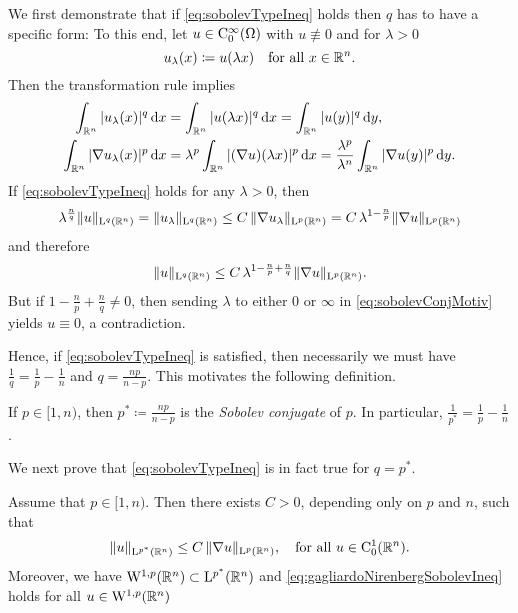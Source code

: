 \begin{motiv}
  We first demonstrate that if \eqref{eq:sobolevTypeIneq} holds then $q$ has to have a specific form:
  To this end, let $u \in \mathrm{C}_0^\infty(\Omega)$ with $u \not\equiv 0$ and for $\lambda > 0$
  $$
  u_\lambda(x) \coloneqq u(\lambda x) \quad\text{for all } x \in \mathbb{R}^n.
  $$
  Then the transformation rule implies
  \begin{align*}
    \int_{\mathbb{R}^n} |u_\lambda(x)|^q \, {\operatorname{d}\!{x}} &= \int_{\mathbb{R}^n} |u(\lambda x)|^q \, {\operatorname{d}\!{x}} = \int_{\mathbb{R}^n} |u(y)|^q \, {\operatorname{d}\!{y}}, \\
    \int_{\mathbb{R}^n} |\nabla u_\lambda(x) |^p \, {\operatorname{d}\!{x}} &= \lambda^p \int_{\mathbb{R}^n} |(\nabla u)(\lambda x)|^p \, {\operatorname{d}\!{x}} = \frac{\lambda^p}{\lambda^n} \int_{\mathbb{R}^n} |\nabla u(y)|^p \, {\operatorname{d}\!{y}}.
  \end{align*}
  If \eqref{eq:sobolevTypeIneq} holds for any $\lambda > 0$, then 
  $$
  \lambda^{\frac{n}{q}} \| u\|_{\mathrm{L}^q(\mathbb{R}^n)}
  = \| u_\lambda\|_{\mathrm{L}^q(\mathbb{R}^n)}
  \leq C \, \|\nabla u_\lambda\|_{\mathrm{L}^p(\mathbb{R}^n)}
  = C \, \lambda^{1 - \frac{n}{p}} \| \nabla u \|_{\mathrm{L}^p(\mathbb{R}^n)}
  $$
  and therefore
  \begin{equation}
    \label{eq:sobolevConjMotiv}
    \|u \|_{\mathrm{L}^q(\mathbb{R}^n)} \leq C \, \lambda^{1 - \frac{n}{p} + \frac{n}{q}} \|\nabla u\|_{\mathrm{L}^p(\mathbb{R}^n)}.
  \end{equation}
  But if $1 - \frac{n}{p} + \frac{n}{q} \neq 0$, then sending $\lambda$ to either $0$ or $\infty$ in \eqref{eq:sobolevConjMotiv} yields $u \equiv 0$, a contradiction.

  Hence, if \eqref{eq:sobolevTypeIneq} is satisfied, then necessarily we must have $\frac{1}{q} = \frac{1}{p} - \frac{1}{n}$ and $q = \frac{n p }{n - p}$.
  This motivates the following definition.
\end{motiv}

\begin{defn}
  If $p \in [1,n)$, then $p^* \coloneqq \frac{np}{n - p}$ is the \emph{Sobolev conjugate} of $p$.
  In particular, $\frac{1}{p^*} = \frac{1}{p} - \frac{1}{n}$.
\end{defn}

We next prove that \eqref{eq:sobolevTypeIneq} is in fact true for $q = p^*$.

\begin{thm}
  \label{thm:gagliardoNirenberg}
  Assume that $p \in [1,n)$.
  Then there exists $C > 0$, depending only on $p$ and $n$, such that
  \begin{equation}
    \label{eq:gagliardoNirenbergSobolevIneq}
    \| u\|_{\mathrm{L}^{p^*}(\mathbb{R}^n)} \leq C \, \|\nabla u\|_{\mathrm{L}^p(\mathbb{R}^n)}, \quad\text{for all } u \in \mathrm{C}_0^1(\mathbb{R}^n).
  \end{equation}
  Moreover, we have $\mathrm{W}^{1,p}(\mathbb{R}^n) \subset \mathrm{L}^{p^*}(\mathbb{R}^n)$ and \eqref{eq:gagliardoNirenbergSobolevIneq} holds for all $u \in \mathrm{W}^{1,p}(\mathbb{R}^n)$
\end{thm}

